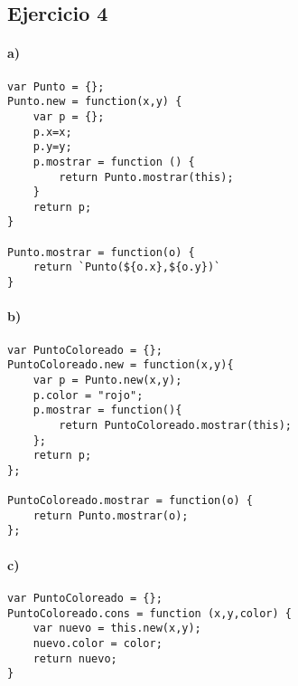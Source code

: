 \documentclass[10pt,a4paper]{article}
\begin{document}
\newpage
\subsection{Ejercicio 4}
\paragraph{a)}
\begin{centrado}
\begin{verbatim}
var Punto = {};
Punto.new = function(x,y) {
    var p = {};
    p.x=x;
    p.y=y;
    p.mostrar = function () {
        return Punto.mostrar(this);
    }
    return p;
}

Punto.mostrar = function(o) {
    return `Punto(${o.x},${o.y})`    
}

\end{verbatim}
\end{centrado}
\paragraph{b)}
\begin{centrado}
\begin{verbatim}
var PuntoColoreado = {};
PuntoColoreado.new = function(x,y){
    var p = Punto.new(x,y);
    p.color = "rojo";
    p.mostrar = function(){ 
        return PuntoColoreado.mostrar(this);
    };
    return p;
};

PuntoColoreado.mostrar = function(o) { 
    return Punto.mostrar(o);
};
\end{verbatim}
\end{centrado}

\paragraph{c)}
\begin{centrado}
\begin{verbatim}
var PuntoColoreado = {};
PuntoColoreado.cons = function (x,y,color) {
    var nuevo = this.new(x,y);
    nuevo.color = color;
    return nuevo;
}
\end{verbatim}
\end{centrado}
\end{document}
